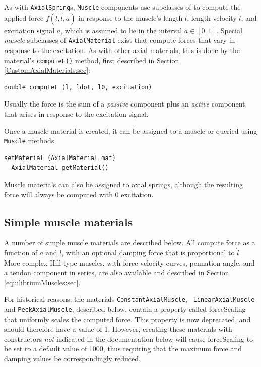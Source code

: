 As with {\tt AxialSpring}s, {\tt Muscle} components use subclasses of
 to compute the
applied force $f (l, \dot l, a)$ in response to the muscle's length
$l$, length velocity $\dot l$, and excitation signal $a$, which is
assumed to lie in the interval $a \in [0,1]$. Special {\it muscle}
subclasses of {\tt AxialMaterial} exist that compute forces that vary
in response to the excitation. As with other axial materials, this is
done by the material's {\tt computeF()} method, first described in
Section \ref{CustomAxialMaterials:sec}:
%
\begin{lstlisting}[]
  double computeF (l, ldot, l0, excitation)
\end{lstlisting}
%
Usually the force is the sum of a {\it passive} component plus an {\it
active} component that arises in response to the excitation signal.

Once a muscle material is created, it can be assigned to a muscle
or queried using {\tt Muscle} methods
\begin{lstlisting}[]
  setMaterial (AxialMaterial mat)
  AxialMaterial getMaterial()
\end{lstlisting}
%

\begin{sideblock}
Muscle materials can also be assigned to axial springs, although the
resulting force will always be computed with 0 excitation.
\end{sideblock}

\subsection{Simple muscle materials}
\label{sec:mechii:musclematerials}

A number of simple muscle materials are described below. All compute
force as a function of $a$ and $l$, with an optional damping force
that is proportional to $\dot l$. More complex Hill-type muscles, with
force velocity curves, pennation angle, and a tendon component in
series, are also available and described in
Section \ref{equilibriumMuscles:sec}.

\begin{sideblock}
For historical reasons, the materials {\tt ConstantAxialMuscle}, {\tt
LinearAxialMuscle} and {\tt PeckAxialMuscle}, described below, contain
a property called {\sf forceScaling} that uniformly scales the
computed force. This property is now deprecated, and should therefore
have a value of 1. However, creating these materials with constructors
{\it not} indicated in the documentation below will cause {\sf
forceScaling} to be set to a default value of 1000, thus requiring
that the maximum force and damping values be correspondingly reduced.
\end{sideblock}

